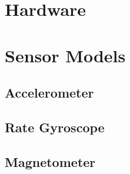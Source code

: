 \documentclass[conference]{IEEEtran}
\begin{document}
\section{Hardware}

\section{Sensor Models}
\subsection{Accelerometer}

\subsection{Rate Gyroscope}

\subsection{Magnetometer}
\end{document}
